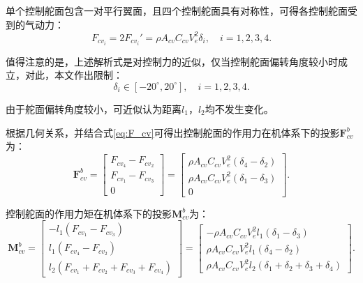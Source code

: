 单个控制舵面包含一对平行翼面，且四个控制舵面具有对称性，可得各控制舵面受到的气动力：
\begin{equation}
    F_{cv_{i}} = 2 F_{cv_{i}}' = \rho A_{cv} C_{cv} V_e^2 \delta _i, \quad i=1,2,3,4.
\end{equation}

值得注意的是，上述解析式是对控制力的近似，仅当控制舵面偏转角度较小时成立，对此，本文作出限制：
\begin{equation}
    \delta_i \in [-20^\circ, 20^\circ], \quad i=1,2,3,4.
\end{equation}

由于舵面偏转角度较小，可近似认为距离$l_1$，$l_2$均不发生变化。

根据几何关系，并结合式\eqref{eq:F_cv}可得出控制舵面的作用力在机体系下的投影$\boldsymbol{F}_{cv}^b$为：
\begin{equation}
    \boldsymbol{F}_{cv}^b = 
    \begin{bmatrix}
        F_{cv_{4}} - F_{cv_{2}} \\
        F_{cv_{1}} - F_{cv_{3}} \\
        0
    \end{bmatrix} = 
    \begin{bmatrix}
        \rho A_{cv} C_{cv} V_e^2 (\delta _4 - \delta _2) \\
        \rho A_{cv} C_{cv} V_e^2 (\delta _1 - \delta _3) \\
        0
    \end{bmatrix}.
    \label{eq:F_cv}
\end{equation}

控制舵面的作用力矩在机体系下的投影$\boldsymbol{M}_{cv}^b$为：
\begin{equation}
    \boldsymbol{M}_{cv}^b = 
    \begin{bmatrix}
        -l_1 (F_{cv_{1}} - F_{cv_{3}}) \\
        l_1 (F_{cv_{4}} - F_{cv_{2}}) \\
        l_2 (F_{cv_{1}} + F_{cv_{2}} + F_{cv_{3}} + F_{cv_{4}})
    \end{bmatrix} = 
    \begin{bmatrix}
        -\rho A_{cv} C_{cv} V_e^2 l_1 (\delta _1 - \delta _3) \\
        \rho A_{cv} C_{cv} V_e^2 l_1 (\delta _4 - \delta _2) \\
        \rho A_{cv} C_{cv} V_e^2 l_2 (\delta _1 + \delta _2 + \delta _3 + \delta _4)
    \end{bmatrix}.
    \label{eq:M_cv}
\end{equation}

